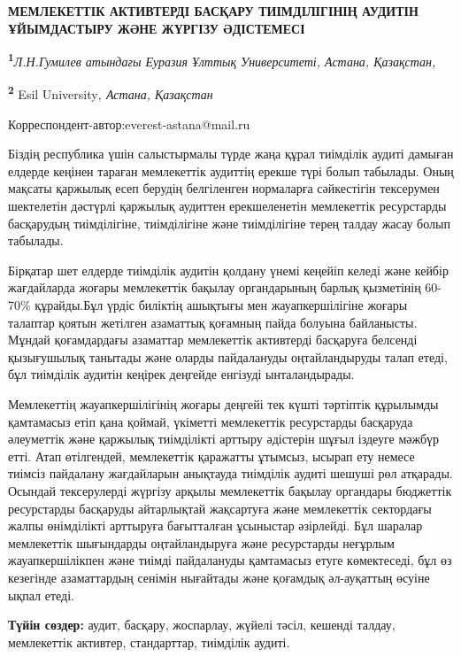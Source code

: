 
{\bfseries МЕМЛЕКЕТТІК АКТИВТЕРДІ БАСҚАРУ ТИІМДІЛІГІНІҢ АУДИТІН ҰЙЫМДАСТЫРУ
ЖӘНЕ ЖҮРГІЗУ ӘДІСТЕМЕСІ}

{\bfseries \textsuperscript{1}}\emph{Л.Н.Гумилев атындағы Еуразия Ұлттық
Университеті, Астана, Қазақстан,}

{\bfseries \textsuperscript{2}} Esil University\emph{, Астана, Қазақстан}

{\bfseries \textsuperscript{\envelope }}Корреспондент-автор:everest-astana@mail.ru

Біздің республика үшін салыстырмалы түрде жаңа құрал тиімділік аудиті
дамыған елдерде кеңінен тараған мемлекеттік аудиттің ерекше түрі болып
табылады. Оның мақсаты қаржылық есеп берудің белгіленген нормаларға
сәйкестігін тексерумен шектелетін дәстүрлі қаржылық аудиттен
ерекшеленетін мемлекеттік ресурстарды басқарудың тиімділігіне,
тиімділігіне және тиімділігіне терең талдау жасау болып табылады.

Бірқатар шет елдерде тиімділік аудитін қолдану үнемі кеңейіп келеді және
кейбір жағдайларда жоғары мемлекеттік бақылау органдарының барлық
қызметінің 60-70\% құрайды.Бұл үрдіс биліктің ашықтығы мен
жауапкершілігіне жоғары талаптар қоятын жетілген азаматтық қоғамның
пайда болуына байланысты. Мұндай қоғамдардағы азаматтар мемлекеттік
активтерді басқаруға белсенді қызығушылық танытады және оларды
пайдалануды оңтайландыруды талап етеді, бұл тиімділік аудитін кеңірек
деңгейде енгізуді ынталандырады.

Мемлекеттің жауапкершілігінің жоғары деңгейі тек күшті тәртіптік
құрылымды қамтамасыз етіп қана қоймай, үкіметті мемлекеттік ресурстарды
басқаруда әлеуметтік және қаржылық тиімділікті арттыру әдістерін шұғыл
іздеуге мәжбүр етті. Атап өтілгендей, мемлекеттік қаражатты ұтымсыз,
ысырап ету немесе тиімсіз пайдалану жағдайларын анықтауда тиімділік
аудиті шешуші рөл атқарады. Осындай тексерулерді жүргізу арқылы
мемлекеттік бақылау органдары бюджеттік ресурстарды басқаруды
айтарлықтай жақсартуға және мемлекеттік сектордағы жалпы өнімділікті
арттыруға бағытталған ұсыныстар әзірлейді. Бұл шаралар мемлекеттік
шығындарды оңтайландыруға және ресурстарды неғұрлым жауапкершілікпен
және тиімді пайдалануды қамтамасыз етуге көмектеседі, бұл өз кезегінде
азаматтардың сенімін нығайтады және қоғамдық әл-ауқаттың өсуіне ықпал
етеді.

{\bfseries Түйін сөздер:} аудит, басқару, жоспарлау, жүйелі тәсіл, кешенді
талдау, мемлекеттік активтер, стандарттар, тиімділік аудиті.

